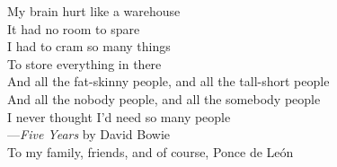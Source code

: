 \documentclass{ucbthesis}
\begin{document}
\begin{frontmatter}

\begin{dedication}
\begin{center}
\vfil\null
My brain hurt like a warehouse\\
It had no room to spare\\
I had to cram so many things\\
To store everything in there\\
And all the fat-skinny people, and all the tall-short people\\
And all the nobody people, and all the somebody people\\
I never thought I'd need so many people\\
\vspace{5 mm}
---\textit{Five Years} by David Bowie\\
\vspace{35 mm}
To my family, friends, and of course, Ponce de Le\'on\\
\end{center}
\end{dedication}

\tableofcontents


\end{frontmatter}
\end{document}
